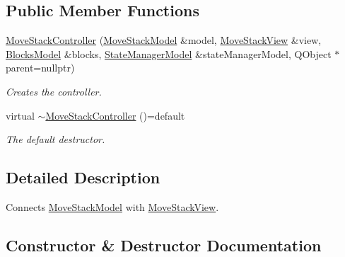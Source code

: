 \subsection*{Public Member Functions}
\begin{DoxyCompactItemize}
\item 
\mbox{\hyperlink{class_move_stack_controller_a99115875c9902519a69eaec92df7dd7f}{Move\+Stack\+Controller}} (\mbox{\hyperlink{class_move_stack_model}{Move\+Stack\+Model}} \&model, \mbox{\hyperlink{class_move_stack_view}{Move\+Stack\+View}} \&view, \mbox{\hyperlink{class_blocks_model}{Blocks\+Model}} \&blocks, \mbox{\hyperlink{class_state_manager_model}{State\+Manager\+Model}} \&state\+Manager\+Model, Q\+Object $\ast$parent=nullptr)
\begin{DoxyCompactList}\small\item\em Creates the controller. \end{DoxyCompactList}\item 
virtual \mbox{\hyperlink{class_move_stack_controller_a1e1f7f27f4c98dadd32f436ff8245d66}{$\sim$\+Move\+Stack\+Controller}} ()=default
\begin{DoxyCompactList}\small\item\em The default destructor. \end{DoxyCompactList}\end{DoxyCompactItemize}


\subsection{Detailed Description}
Connects \mbox{\hyperlink{class_move_stack_model}{Move\+Stack\+Model}} with \mbox{\hyperlink{class_move_stack_view}{Move\+Stack\+View}}. 



\subsection{Constructor \& Destructor Documentation}
\mbox{\label{class_move_stack_controller_a99115875c9902519a69eaec92df7dd7f}} 
